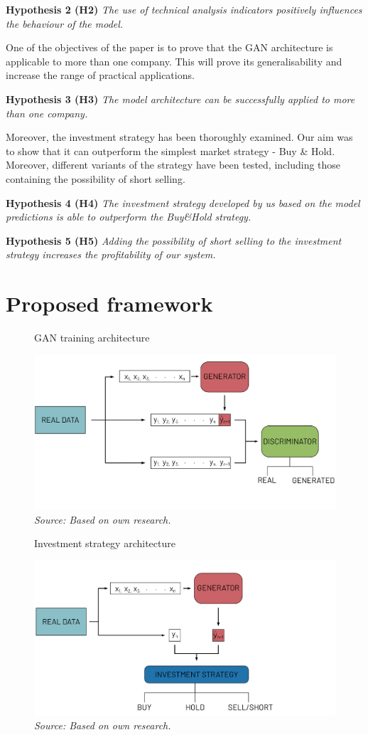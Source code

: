 \documentclass[11pt]{article} %
\begin{document}
\textbf{Hypothesis 2 (H2)} \textit{The use of technical analysis indicators positively influences the behaviour of the model.}

One of the objectives of the paper is to prove that the GAN architecture is applicable to more than one company. This will prove its generalisability and increase the range of practical applications.

\textbf{Hypothesis 3 (H3)} \textit{The model architecture can be successfully applied to more than one company.}

Moreover, the investment strategy has been thoroughly examined. Our aim was to show that it can outperform the simplest market strategy - Buy \& Hold. Moreover, different variants of the strategy have been tested, including those containing the possibility of short selling. 

\textbf{Hypothesis 4 (H4)} \textit{The investment strategy developed by us based on the model predictions is able to outperform the Buy\&Hold strategy.} 

\textbf{Hypothesis 5 (H5)} \textit{Adding the possibility of short selling to the investment strategy increases the profitability of our system.}


\section{Proposed framework}

\begin{figure}[H]
\caption{GAN training architecture}
\includegraphics{rysunek1.png}
\caption*{\textit{Source: Based on own research.}}
\end{figure}

\begin{figure}[H]
\caption{Investment strategy architecture}
\includegraphics{rysunek2.png}
\caption*{\textit{Source: Based on own research.}}
\end{figure}
\end{document}
